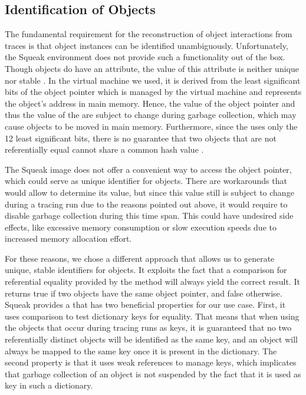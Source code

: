 \subsection{Identification of Objects}
\label{ss:ImplementationTracingIdentification}
The fundamental requirement for the reconstruction of object interactions from traces is that object instances can be identified unambiguously.
Unfortunately, the Squeak environment does not provide such a functionality out of the box.
Though objects do have an  attribute, the value of this attribute is neither unique nor stable \cite{goldberg_smalltalk-80:_1983}.
In the virtual machine we used, it is derived from the least significant bits of the object pointer which is managed by the virtual machine and represents the object's address in main memory.
Hence, the value of the object pointer and thus the value of the  are subject to change during garbage collection, which may cause objects to be moved in main memory.
Furthermore, since the  uses only the 12 least significant bits, there is no guarantee that two objects that are not referentially equal cannot share a common hash value \cite{goldberg_smalltalk-80:_1983}.

The Squeak image does not offer a convenient way to access the object pointer, which could serve as unique identifier for objects.
There are workarounds that would allow to determine its value, but since this value still is subject to change during a tracing run due to the reasons pointed out above, it would require to disable garbage collection during this time span.
This could have undesired side effects, like excessive memory consumption or slow execution speeds due to increased memory allocation effort.

For these reasons, we chose a different approach that allows us to generate unique, stable identifiers for objects.
It exploits the fact that a comparison for referential equality provided by the \inlinecode{==} method will always yield the correct result.
It returns true if two objects have the same object pointer, and false otherwise.
Squeak provides a  that has two beneficial properties for our use case.
First, it uses \inlinecode{==} comparison to test dictionary keys for equality.
That means that when using the objects that occur during tracing runs as keys, it is guaranteed that no two referentially distinct objects will be identified as the same key, and an object will always be mapped to the same key once it is present in the dictionary.
The second property is that it uses weak references to manage keys, which implicates that garbage collection of an object is not suspended by the fact that it is used as key in such a dictionary.

